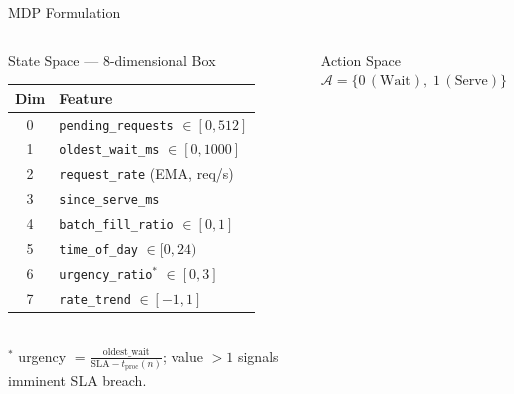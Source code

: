 \documentclass[aspectratio=169]{beamer}
\begin{document}
\begin{frame}{MDP Formulation}
  \begin{columns}[T]
      \begin{block}{State Space — 8-dimensional Box}
        \renewcommand{\arraystretch}{1.2}
        \begin{tabular}{@{}cl@{}}
          \toprule
          \textbf{Dim} & \textbf{Feature} \\
          \midrule
          0 & \texttt{pending\_requests} $\in [0,512]$ \\
          1 & \texttt{oldest\_wait\_ms} $\in [0,1000]$ \\
          2 & \texttt{request\_rate} (EMA, req/s) \\
          3 & \texttt{since\_serve\_ms} \\
          4 & \texttt{batch\_fill\_ratio} $\in [0,1]$ \\
          5 & \texttt{time\_of\_day} $\in [0,24)$ \\
          6 & \texttt{urgency\_ratio}$^*$ $\in [0,3]$ \\
          7 & \texttt{rate\_trend} $\in [-1,1]$ \\
          \bottomrule
        \end{tabular}\\[4pt]
        \scriptsize $^*$ urgency $= \frac{\text{oldest\_wait}}{\text{SLA} - t_\text{proc}(n)}$;
        value $>1$ signals imminent SLA breach.
      \end{block}
      \begin{block}{Action Space}
        $\mathcal{A} = \{0\,(\text{Wait}),\; 1\,(\text{Serve})\}$
      \end{block}


\end{columns}
\end{frame}
\end{document}
